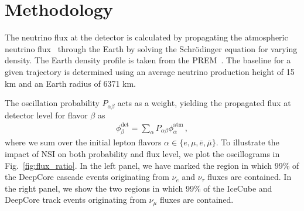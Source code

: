 \documentclass[draft=True]{revtex4-2}
\renewcommand{\ne}{\nu_e}
\newcommand{\nm}{\nu_\mu}
\newcommand{\nt}{\nu_\tau}
\begin{document}
\section{Methodology}
The neutrino flux at the detector is calculated by propagating the atmospheric neutrino flux~\cite{hondapaper} through the Earth by solving the 
Schrödinger equation for varying density. The Earth density profile is taken from the PREM~\cite{PREM}. The baseline for a given trajectory is determined using an average neutrino
production height of 15 km and an Earth radius of 6371 km. %


The oscillation probability $P_{\alpha \beta}$ acts as a weight, yielding the propagated flux at detector level for flavor $\beta$ as 
\begin{align}\label{eq:propFlux}
    \phi_\beta^\text{det} = \sum_\alpha P_{\alpha\beta} \phi_\alpha^\text{atm} \,,
\end{align}
where we sum over the initial lepton flavors $\alpha \in \{e,\mu, \bar{e}, \bar{\mu}\}$. To illustrate the impact of NSI on both probability
and flux level, we plot the oscillograms in Fig.~\ref{fig:flux_ratio}. In the left panel, we have marked the region in which 99\% of the 
DeepCore cascade events originating from $\ne$ and $\nt$ fluxes are contained. In the right panel, we show the two regions in which 99\% of the IceCube 
and DeepCore track events originating from $\nm$ fluxes are contained. 
\end{document}
